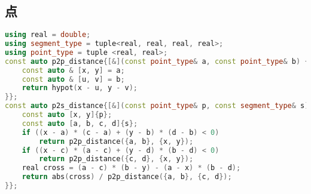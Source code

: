 \subsection{点}
  \begin{lstlisting}[language=c++]
using real = double;
using segment_type = tuple<real, real, real, real>;
using point_type = tuple <real, real>;
const auto p2p_distance{[&](const point_type& a, const point_type& b) {
    const auto & [x, y] = a;
    const auto & [u, v] = b;
    return hypot(x - u, y - v);
}};
const auto p2s_distance{[&](const point_type& p, const segment_type& s) {
    const auto [x, y]{p};
    const auto [a, b, c, d]{s};
    if ((x - a) * (c - a) + (y - b) * (d - b) < 0) 
        return p2p_distance({a, b}, {x, y});
    if ((x - c) * (a - c) + (y - d) * (b - d) < 0)
        return p2p_distance({c, d}, {x, y});
    real cross = (a - c) * (b - y) - (a - x) * (b - d);
    return abs(cross) / p2p_distance({a, b}, {c, d});
}};
  \end{lstlisting}
